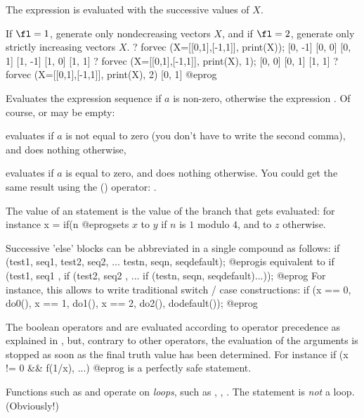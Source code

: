The expression  is evaluated with the successive values of $X$.

If $\fl=1$, generate only nondecreasing vectors $X$, and
if $\fl=2$, generate only strictly increasing vectors $X$.
\bprog
? forvec (X=[[0,1],[-1,1]], print(X));
[0, -1]
[0, 0]
[0, 1]
[1, -1]
[1, 0]
[1, 1]
? forvec (X=[[0,1],[-1,1]], print(X), 1);
[0, 0]
[0, 1]
[1, 1]
? forvec (X=[[0,1],[-1,1]], print(X), 2)
[0, 1]
@eprog

\label{se:if}
Evaluates the expression sequence  if $a$ is non-zero, otherwise
the expression . Of course,  or  may be empty:

 evaluates  if $a$ is not equal to zero
(you don't have to write the second comma), and does nothing otherwise,

 evaluates  if $a$ is equal to zero, and
does nothing otherwise. You could get the same result using the \kbd{!}
() operator: .

The value of an  statement is the value of the branch that gets
evaluated: for instance
\bprog
x = if(n %
@eprog\noindent sets $x$ to $y$ if $n$ is $1$ modulo $4$, and to $z$
otherwise.

Successive 'else' blocks can be abbreviated in a single compound 
as follows:
\bprog
if (test1, seq1,
    test2, seq2,
    ...
    testn, seqn,
    seqdefault);
@eprog\noindent is equivalent to
\bprog
if (test1, seq1
         , if (test2, seq2
                    , ...
                      if (testn, seqn, seqdefault)...));
@eprog For instance, this allows to write traditional switch / case
constructions:
\bprog
if (x == 0, do0(),
    x == 1, do1(),
    x == 2, do2(),
    dodefault());
@eprog

The boolean operators \kbd{\&\&} and \kbd{||} are evaluated
according to operator precedence as explained in , but,
contrary to other operators, the evaluation of the arguments is stopped
as soon as the final truth value has been determined. For instance
\bprog
if (x != 0 && f(1/x), ...)
@eprog
\noindent is a perfectly safe statement.

 Functions such as  and  operate on
\emph{loops}, such as , , . The 
statement is \emph{not} a loop. (Obviously!)

